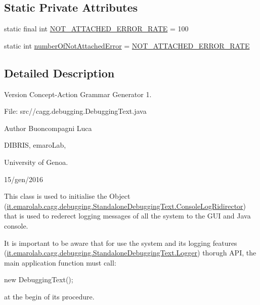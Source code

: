\subsection*{Static Private Attributes}
\begin{DoxyCompactItemize}
\item 
static final int \hyperlink{classit_1_1emarolab_1_1cagg_1_1debugging_1_1StandaloneDebuggingText_a2bc49514390e3f0fa6612a5bda61264e}{N\-O\-T\-\_\-\-A\-T\-T\-A\-C\-H\-E\-D\-\_\-\-E\-R\-R\-O\-R\-\_\-\-R\-A\-T\-E} = 100
\item 
static int \hyperlink{classit_1_1emarolab_1_1cagg_1_1debugging_1_1StandaloneDebuggingText_a76c9558556e26023809b47c76c1527ed}{number\-Of\-Not\-Attached\-Error} = \hyperlink{classit_1_1emarolab_1_1cagg_1_1debugging_1_1StandaloneDebuggingText_a2bc49514390e3f0fa6612a5bda61264e}{N\-O\-T\-\_\-\-A\-T\-T\-A\-C\-H\-E\-D\-\_\-\-E\-R\-R\-O\-R\-\_\-\-R\-A\-T\-E}
\end{DoxyCompactItemize}


\subsection{Detailed Description}
\begin{DoxyVersion}{Version}
Concept-\/\-Action Grammar Generator 1. \par
 File\-: src//cagg.debugging.\-Debugging\-Text.\-java \par

\end{DoxyVersion}
\begin{DoxyAuthor}{Author}
Buoncompagni Luca \par
 D\-I\-B\-R\-I\-S, emaro\-Lab,\par
 University of Genoa. \par
 15/gen/2016 \par

\end{DoxyAuthor}


This class is used to initialise the Object (\hyperlink{classit_1_1emarolab_1_1cagg_1_1debugging_1_1StandaloneDebuggingText_1_1ConsoleLogRidirector}{it.\-emarolab.\-cagg.\-debugging.\-Standalone\-Debugging\-Text.\-Console\-Log\-Ridirector}) that is used to rederect logging messages of all the system to the G\-U\-I and Java console. \par
 It is important to be aware that for use the system and its logging features (\hyperlink{}{it.\-emarolab.\-cagg.\-debugging.\-Standalone\-Debugging\-Text.\-Logger}) thorugh A\-P\-I, the main application function must call\-:
\begin{DoxyCode}
\textcolor{keyword}{new} DebuggingText(); 
\end{DoxyCode}
 at the begin of its procedure. 

